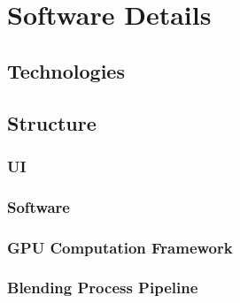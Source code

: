 \chapter{Software Details}

  \section {Technologies}
  
  \section {Structure}
    \subsection {UI}
    \subsection {Software}
    \subsection {GPU Computation Framework}
    \subsection {Blending Process Pipeline}
    
